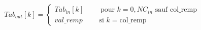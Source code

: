 \[
Tab_{out}[k] =
\begin{cases}
Tab_{in}[k] \qquad \text{ pour } k=0, NC_{in} \text{ sauf col\_remp} \\
val\_remp \qquad \text{ si }  k= \text{col\_remp}
\end{cases}
\]

